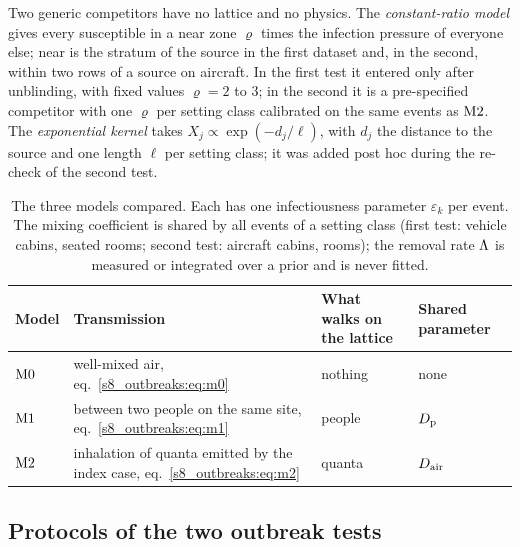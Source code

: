 Two generic competitors have no lattice and no physics. The \emph{constant-ratio model} gives every susceptible
in a near zone $\varrho$ times the infection pressure of everyone else; near is the stratum of the source in the
first dataset and, in the second, within two rows of a source on aircraft. In the first test it entered only
after unblinding, with fixed values $\varrho=2$ to 3; in the second it is a pre-specified competitor with one
$\varrho$ per setting class calibrated on the same events as $\mathrm{M2}$. The \emph{exponential kernel} takes
$X_j\propto\exp(-d_j/\ell)$, with $d_j$ the distance to the source and one length $\ell$ per setting class; it was
added post hoc during the re-check of the second test.

\begin{table}[tbp]
  \centering\small
  \caption{The three models compared. Each has one infectiousness parameter $\varepsilon_k$ per event. The
  mixing coefficient is shared by all events of a setting class (first test: vehicle cabins, seated rooms;
  second test: aircraft cabins, rooms); the removal rate $\Lambda$ is measured or integrated over a prior
  and is never fitted.}
  \label{s8_outbreaks:tab:models}
  \begin{tabular}{@{}l>{\raggedright\arraybackslash}p{}>{\raggedright\arraybackslash}p{}>{\raggedright\arraybackslash}p{}@{}}
    \toprule
    Model & Transmission & What walks on the lattice & Shared parameter \\
    \midrule
    $\mathrm{M0}$ & well-mixed air, eq.~\eqref{s8_outbreaks:eq:m0} & nothing & none \\
    $\mathrm{M1}$  & between two people on the same site, eq.~\eqref{s8_outbreaks:eq:m1} & people & $D_{\mathrm{p}}$ \\
    $\mathrm{M2}$  & inhalation of quanta emitted by the index case, eq.~\eqref{s8_outbreaks:eq:m2} & quanta & $D_{\mathrm{air}}$ \\
    \bottomrule
  \end{tabular}
\end{table}

\subsection{Protocols of the two outbreak tests}\label{s8_outbreaks:sec:protocol}

